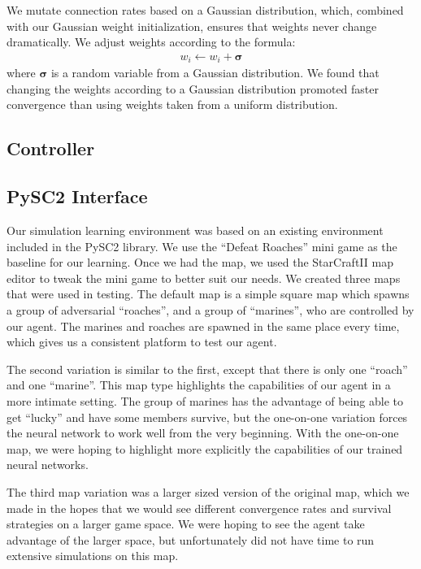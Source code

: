 \documentclass{article}
\begin{document}
\begin{multicols}{2}
We mutate connection rates based on a Gaussian distribution, which, combined
with our Gaussian weight initialization, ensures that weights never change
dramatically. We adjust weights according to the formula:
\begin{align}
  w_i \leftarrow w_i + \bm{\sigma}
\end{align}
where $\bm{\sigma}$ is a random variable from a Gaussian
distribution. We found that changing the weights according to a Gaussian
distribution promoted faster convergence than using weights taken from a uniform
distribution.

\subsection{Controller}

\subsection{PySC2 Interface}
Our simulation learning environment was based on an existing environment
included in the PySC2 library\cite{pysc2}. We use the ``Defeat Roaches'' mini
game as the baseline for our learning. Once we had the map, we used the
StarCraftII map editor to tweak the mini game to better suit our needs. We
created three maps that were used in testing. The default map is a simple square
map which spawns a group of adversarial ``roaches'', and a group of ``marines'',
who are controlled by our agent. The marines and roaches are spawned in the same
place every time, which gives us a consistent platform to test our agent.

The second variation is similar to the first, except that there is only one
``roach'' and one ``marine''. This map type highlights the capabilities of our
agent in a more intimate setting. The group of marines has the advantage of
being able to get ``lucky'' and have some members survive, but the one-on-one
variation forces the neural network to work well from the very beginning.  With
the one-on-one map, we were hoping to highlight more explicitly the capabilities
of our trained neural networks.

The third map variation was a larger sized version of the original map, which we
made in the hopes that we would see different convergence rates and survival
strategies on a larger game space. We were hoping to see the agent take
advantage of the larger space, but unfortunately did not have time to run
extensive simulations on this map.


\end{multicols}
\end{document}
